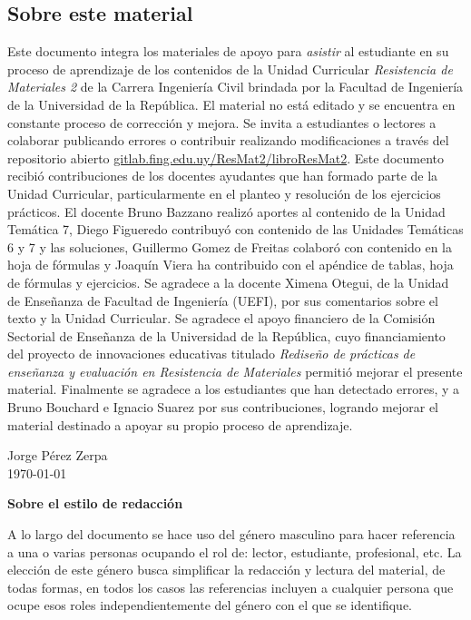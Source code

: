 \subsection*{Sobre este material}

Este documento integra los materiales de apoyo para \textit{asistir} al estudiante en su proceso de aprendizaje de los contenidos de la Unidad Curricular \textit{Resistencia de Materiales 2} de la Carrera Ingeniería Civil brindada por la Facultad de Ingeniería de la Universidad de la República. %
%
El material no está editado y se encuentra en constante proceso de corrección y mejora. Se invita a estudiantes o lectores a colaborar publicando errores o contribuir realizando modificaciones a través del repositorio abierto \href{https://gitlab.fing.edu.uy/ResMat2/libroResMat2}{gitlab.fing.edu.uy/ResMat2/libroResMat2}. %
%
Este documento recibió contribuciones de los docentes ayudantes que han formado parte de la Unidad Curricular, particularmente en el planteo y resolución de los ejercicios prácticos. %
%
El docente Bruno Bazzano realizó aportes al contenido de la Unidad Temática 7, Diego Figueredo contribuyó con contenido de las Unidades Temáticas 6 y 7 y las soluciones, Guillermo Gomez de Freitas colaboró con contenido en la hoja de fórmulas y Joaquín Viera ha contribuido con el apéndice de tablas, hoja de fórmulas y  ejercicios. %
%
Se agradece a la docente Ximena Otegui, de la Unidad de Enseñanza de Facultad de Ingeniería (UEFI), por sus comentarios sobre el texto y la Unidad Curricular. %
%
Se agradece el apoyo financiero de la Comisión Sectorial de Enseñanza de la Universidad de la República, cuyo financiamiento del proyecto de innovaciones educativas titulado \textit{Rediseño de prácticas de enseñanza y evaluación en Resistencia de Materiales} permitió mejorar el presente material. %
%
Finalmente se agradece a los estudiantes que han detectado errores, y a Bruno Bouchard  e Ignacio Suarez por sus contribuciones, logrando mejorar el material destinado a apoyar su propio proceso de aprendizaje.

\begin{flushright}
Jorge Pérez Zerpa\\
\today
\end{flushright} 


\vspace{5mm}

\noindent
\textbf{Sobre el estilo de redacción}

A lo largo del documento se hace uso del género masculino para hacer referencia a una o varias personas ocupando el rol de: lector, estudiante, profesional, etc. La elección de este género busca simplificar la redacción y lectura del material, de todas formas, en todos los casos las referencias incluyen a cualquier persona que ocupe esos roles independientemente del género con el que se identifique.

